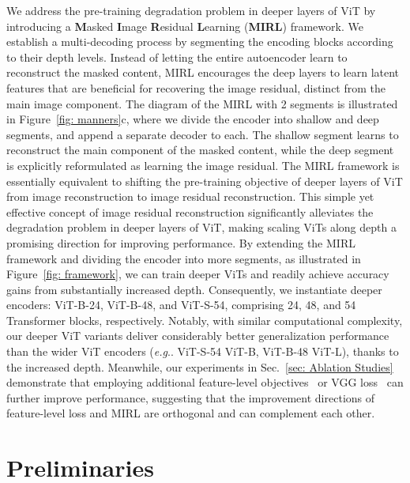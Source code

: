 \documentclass{article}
\makeatletter
\DeclareRobustCommand\onedot{\futurelet\@let@token\@onedot}
\def\@onedot{\ifx\@let@token.\else.\null\fi\xspace}
\def\eg{\emph{e.g}\onedot} \def\Eg{\emph{E.g}\onedot}
\makeatother
\begin{document}
We address the pre-training degradation problem in deeper layers of ViT by introducing a \textbf{M}asked \textbf{I}mage \textbf{R}esidual \textbf{L}earning (\textbf{MIRL}) framework. We establish a multi-decoding process by segmenting the encoding blocks according to their depth levels. 
Instead of letting the entire autoencoder learn to reconstruct the masked content, MIRL
encourages the deep layers to learn latent features that are beneficial for recovering the image residual, distinct from the main image component. 
The diagram of the MIRL with 2 segments is illustrated in Figure~\ref{fig: manners}c, where we divide the encoder into shallow and deep segments, and append a separate decoder to each. 
The shallow segment learns to reconstruct the main component of the masked content, while the deep segment is explicitly reformulated as learning the image residual.
The MIRL framework is essentially equivalent to shifting the pre-training objective of deeper layers of ViT from image reconstruction to image residual reconstruction. 
This simple yet effective concept of image residual reconstruction significantly alleviates the degradation problem in deeper layers of ViT, making scaling ViTs along depth a promising direction for improving performance.
By extending the MIRL framework and dividing the encoder into more segments, as illustrated in Figure~\ref{fig: framework}, we can train deeper ViTs and readily achieve accuracy gains from substantially increased depth. 
Consequently, we instantiate deeper encoders: ViT-B-24, ViT-B-48, and ViT-S-54, comprising 24, 48, and 54 Transformer blocks, respectively. Notably, with similar computational complexity, our deeper ViT variants deliver considerably better generalization performance than the wider ViT encoders (\eg ViT-S-54 \vs ViT-B, ViT-B-48 \vs ViT-L), thanks to the increased depth.
Meanwhile, our experiments in Sec.~\ref{sec: Ablation Studies} demonstrate that employing additional feature-level objectives~\cite{dong2022bootstrapped,chen2022sdae} or VGG loss~\cite{johnson2016perceptual,dong2021peco} can further improve performance, suggesting that the improvement directions of feature-level loss and MIRL are orthogonal and can complement each other.



\vspace{5pt}
\section{Preliminaries}
\vspace{5pt}
\end{document}
